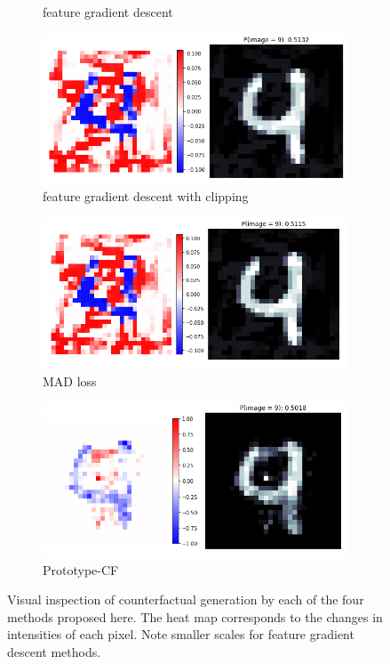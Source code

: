 \documentclass[letterpaper]{article} %
\begin{document}
\begin{figure}[hbt!]
\begin{subfigure}{0.5\textwidth}
        \caption{feature gradient descent}
        \label{fig:simple}
    \end{subfigure}%
    \begin{subfigure}{0.5\textwidth}
        \centering
        \includegraphics[width=0.99\linewidth]{figures/mnist/clip.png}
        \caption{feature gradient descent with clipping}
        \label{fig:clipping}
    \end{subfigure}
    \begin{subfigure}{0.5\textwidth}
        \centering
        \includegraphics[width=0.99\linewidth]{figures/mnist/mad.png}
        \caption{MAD loss}
        \label{fig:wachter}
    \end{subfigure}%
    \begin{subfigure}{0.5\textwidth}
        \centering
        \includegraphics[width=0.99\linewidth]{figures/mnist/proto.png}
        \caption{Prototype-CF}
        \label{fig:proto}
    \end{subfigure}
    \caption{Visual inspection of counterfactual generation by each of the four methods proposed here. The heat map corresponds to the changes in intensities of each pixel. Note smaller scales for feature gradient descent methods. }
    \label{fig:images}
\end{figure}
\end{document}
